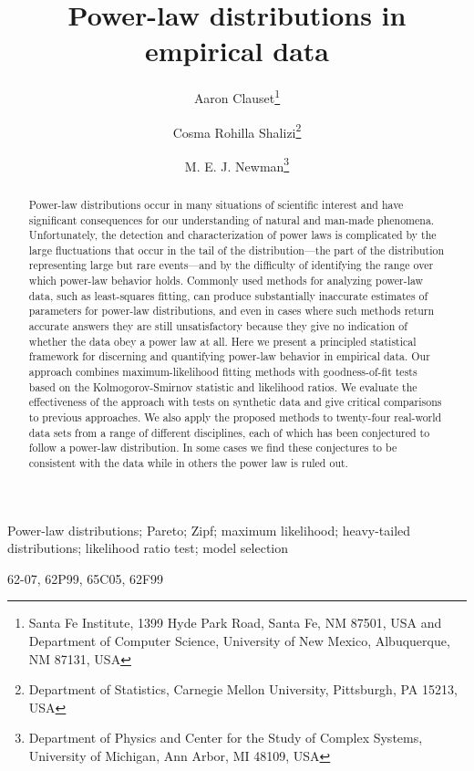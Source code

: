 \documentclass[final]{siamltex}
\title{Power-law distributions in empirical data}
\author{Aaron Clauset\thanks{Santa Fe Institute, 1399 Hyde Park Road, Santa Fe, NM 87501,
 USA and Department of Computer Science, University of New Mexico, Albuquerque, NM 87131, USA}
 \and Cosma Rohilla Shalizi\thanks{Department of Statistics, Carnegie Mellon University, Pittsburgh, PA 15213, USA}
 \and M. E. J. Newman\thanks{Department of Physics and Center for the Study of Complex Systems, University of Michigan, Ann Arbor, MI 48109, USA}
 }
\begin{document}
\maketitle

\begin{abstract}
 Power-law distributions occur in many situations of scientific interest
 and have significant consequences for our understanding of natural and
 man-made phenomena.  Unfortunately, the detection and characterization of
 power laws is complicated by the large fluctuations that occur in the
 tail of the distribution---the part of the distribution representing
 large but rare events---and by the difficulty of identifying the range
 over which power-law behavior holds.  Commonly used methods for analyzing
 power-law data, such as least-squares fitting, can produce substantially
 inaccurate estimates of parameters for power-law distributions, and even
 in cases where such methods return accurate answers they are still
 unsatisfactory because they give no indication of whether the data obey a
 power law at all.  Here we present a principled statistical framework for
 discerning and quantifying power-law behavior in empirical data.  Our
 approach combines maximum-likelihood fitting methods with goodness-of-fit
 tests based on the Kolmogorov-Smirnov statistic and likelihood ratios.
 We evaluate the effectiveness of the approach with tests on synthetic
 data and give critical comparisons to previous approaches.  We also apply
 the proposed methods to twenty-four real-world data sets from a range of
 different disciplines, each of which has been conjectured to follow a
 power-law distribution.  In some cases we find these conjectures to be
 consistent with the data while in others the power law is ruled out.
\end{abstract}

\begin{keywords}
 Power-law distributions; Pareto; Zipf; maximum likelihood; heavy-tailed
 distributions; likelihood ratio test; model selection
\end{keywords}

\begin{AMS} 62-07, 62P99, 65C05, 62F99 \end{AMS}

\pagestyle{myheadings}
\thispagestyle{plain}
\end{document}
